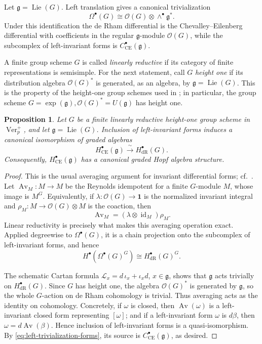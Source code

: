 \documentclass[12pt]{amsart}
\newtheorem{proposition}[theorem]{Proposition}
\theoremstyle{remark}
\DeclareMathOperator{\Ver}{Ver}
\DeclareMathOperator{\Lie}{Lie}
\newcommand{\g}{\mathfrak g}
\newcommand{\one}{\mathbf 1}
\newcommand{\CE}{\mathrm{CE}}
\newcommand{\dR}{\mathrm{dR}}
\begin{document}
Let $\g=\Lie(G)$.  Left translation gives a canonical trivialization
\begin{equation}\label{eq:left-trivialization-forms}
 \Omega^\bullet(G)
 \cong \mathcal O(G)\otimes\wedge^\bullet\g^*.
\end{equation}
Under this identification the de Rham differential is the
Chevalley--Eilenberg differential with coefficients in the regular
$\g$-module $\mathcal O(G)$, while the subcomplex of left-invariant forms is
$C^\bullet_{\CE}(\g)$.

A finite group scheme $G$ is called \emph{linearly reductive} if its
category of finite representations is semisimple.  For the next statement,
call $G$ \emph{height one} if
its distribution algebra $\mathcal O(G)^*$ is generated, as an algebra, by
$\g=\Lie(G)$.  This is the property of the height-one group schemes used in
\cite[Section~4]{CEO24}; in particular, the group scheme 
$G=\exp(\g), \mathcal O(G)^*=U(\g)$
has height one.

\begin{proposition}\label{prop:dR-CE}
Let $G$ be a finite linearly reductive height-one group scheme in $\Ver_p^+$,
and let $\g=\Lie(G)$.  Inclusion of left-invariant forms induces a canonical
isomorphism of graded algebras
\[
 H^\bullet_{\CE}(\g)\xrightarrow{\ \sim\ }H^\bullet_{\dR}(G).
\]
Consequently, $H^\bullet_{\CE}(\g)$ has a canonical graded Hopf algebra
structure.  
\end{proposition}

\begin{proof}
This is the usual averaging argument for invariant differential forms; cf.\
\cite{CE48,HK62}.  Let
$\operatorname{Av}_M:M\to M$ be the Reynolds idempotent for a finite
$G$-module $M$, whose image is $M^G$.  Equivalently, if
$\lambda:\mathcal O(G)\to\one$ is the normalized invariant integral and
$\rho_M:M\to\mathcal O(G)\otimes M$ is the coaction, then
\[
 \operatorname{Av}_M=(\lambda\otimes\operatorname{id}_M)\rho_M.
\]
Linear reductivity is precisely what makes this averaging operation exact.
Applied degreewise to $\Omega^\bullet(G)$, it is a chain projection onto the
subcomplex of left-invariant forms, and hence
\[
 H^\bullet(\Omega^\bullet(G)^G)
 \cong H^\bullet_{\dR}(G)^G.
\]

The schematic Cartan formula
$\mathcal L_x=d\,\iota_x+\iota_xd$, $x\in\g$,
shows that $\g$ acts trivially on $H^\bullet_{\dR}(G)$.  Since $G$ has height
one, the algebra $\mathcal O(G)^*$ is generated by $\g$, so the whole
$G$-action on de Rham cohomology is trivial.  Thus averaging acts as the
identity on cohomology.  Concretely, if $\omega$ is closed, then
$\operatorname{Av}(\omega)$ is a left-invariant closed form representing
$[\omega]$; and if a left-invariant form $\omega$ is $d\beta$, then
$\omega=d\operatorname{Av}(\beta)$.  Hence inclusion of left-invariant
forms is a quasi-isomorphism.  By
\eqref{eq:left-trivialization-forms}, its source is
$C^\bullet_{\CE}(\g)$, as desired.
\end{proof}
\end{document}

